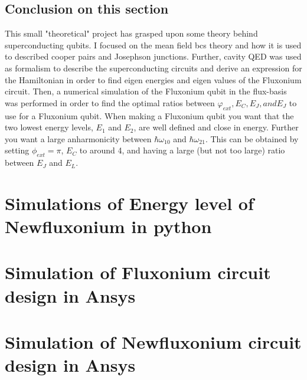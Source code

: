     \section{Conclusion on this section}
    This small "theoretical" project has grasped upon some theory behind superconducting qubits. I focused on the mean field \acrshort{bcs} theory and how it is used to described cooper pairs and Josephson junctions. Further, cavity QED was used as formalism to describe the superconducting circuits and derive an expression for the Hamiltonian in order to find eigen energies and eigen values of the Fluxonium circuit. Then, a numerical simulation of the Fluxonium qubit in the flux-basis was performed in order to find the optimal ratios between $\varphi_{ext}, E_C, E_J, and E_J$ to use for a Fluxonium qubit. When making a Fluxonium qubit you want that the two lowest energy levels, $E_1$ and $E_2$, are well defined and close in energy. Further you want a large anharmonicity between $\hbar \omega_{10}$ and $\hbar \omega_{21}$. This can be obtained by setting $\phi_{ext} = \pi$, $E_C $ to around 4, and having a large (but not too large) ratio between $E_J$ and $E_L$.


\chapter{Simulations of Energy level of Newfluxonium in python}
    

\chapter{Simulation of Fluxonium circuit design in Ansys}
    
\chapter{Simulation of Newfluxonium circuit design in Ansys}